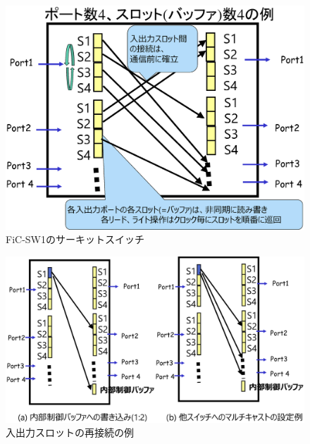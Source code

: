 \begin{figure}[ht]  
 \begin{center}   
	\includegraphics[width=1.0\columnwidth]{fig/switch.eps}
  \caption{FiC-SW1のサーキットスイッチ}
  \label{fig_switch}  
 \end{center}  
\end{figure}

\begin{figure}[ht]  
 \begin{center}   
	\includegraphics[width=1.0\columnwidth]{fig/multicast.eps}
  \caption{入出力スロットの再接続の例}
  \label{fig_multicast}  
 \end{center}  
\end{figure}

